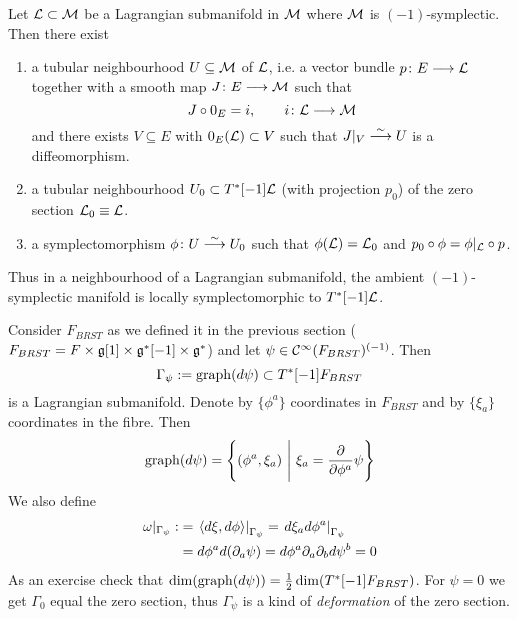 \begin{theo}
  Let $\mathcal{L} \subset \mathcal{M}$ be a Lagrangian submanifold in $\mathcal{M}$ where $\mathcal{M}$ is $(-1)$-symplectic. Then there exist
  \begin{enumerate}
    \item a tubular neighbourhood $U \subseteq \mathcal{M}$ of $\mathcal{L}$, i.e. a vector bundle $p \colon E \longrightarrow \mathcal{L}$ together with a smooth map $J \colon E \longrightarrow \mathcal{M}$ such that
    \begin{equation}
      J \circ 0_E = i, \quad \quad i \colon \mathcal{L} \longrightarrow \mathcal{M}
    \end{equation}
    and there exists $V \subseteq E$ with $0_E(\mathcal{L}) \subset V$ such that $J|_V \overset{\sim}{\longrightarrow} U$ is a diffeomorphism.

    \item a tubular neighbourhood $U_0 \subset T^*[-1] \mathcal{L}$ (with projection $p_0$) of the zero section $\mathcal{L}_0 \equiv \mathcal{L}$.

    \item a symplectomorphism $\phi \colon U \atob{\sim} U_0$ such that $\phi(\LL) = \LL_0$ and $p_0 \circ \phi = \phi|_\LL \circ p$.
  \end{enumerate}
\end{theo}

Thus in a neighbourhood of a Lagrangian submanifold, the ambient $(-1)$-symplectic manifold is locally symplectomorphic to $T^*[-1]\mathcal{L}$.

\begin{example}
  Consider $F_{BRST}$ as we defined it in the previous section ($F_{BRST} = F \times \mathfrak{g}[1] \times \mathfrak{g}^*[-1] \times \mathfrak{g}^*$) and let $\psi \in \mathcal{C}^{\infty}(F_{BRST})^{(-1)}$. Then
  \begin{equation}
    \Gamma_\psi := \operatorname{graph}(d \psi) \subset T^*[-1]F_{BRST}
  \end{equation}
  is a Lagrangian submanifold. Denote by $\{\phi^a\}$ coordinates in $F_{BRST}$ and by $\{\xi_a\}$ coordinates in the fibre. Then
  \begin{equation}
    \graph(d \psi) = \left\{ (\phi^a, \xi_a) \ \Bigg| \ \xi_a = \dell{}{\phi^a} \psi \right\}
  \end{equation}
  We also define
  \begin{align}
    \omega |_{\Gamma_\psi} :&= \left. \pair{d\xi}{d\phi} \right|_{\Gamma_\psi} = \left. d \xi_a d\phi^a \right|_{\Gamma_\psi} \\
    &= d\phi^a d (\partial_a \psi)  = d\phi^a \partial_a \partial_b d\psi^b = 0
  \end{align}
  As an exercise check that $\dim(\operatorname{graph}(d \psi)) = \frac{1}{2} \dim(T^*[-1]F_{BRST})$. For $\psi = 0$ we get $\Gamma_0$ equal the zero section, thus $\Gamma_\psi$ is a kind of \emph{deformation} of the zero section.
\end{example}


